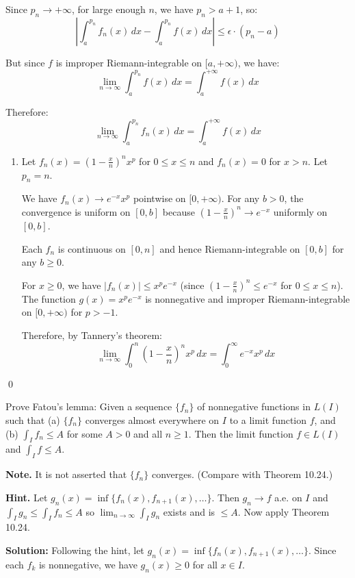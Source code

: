 Since $p_n \to +\infty$, for large enough $n$, we have $p_n > a + 1$, so:
\[|\int_a^{p_n} f_n(x) \, dx - \int_a^{p_n} f(x) \, dx| \leq \epsilon \cdot (p_n - a)\]

But since $f$ is improper Riemann-integrable on $[a,+\infty)$, we have:
\[\lim_{n \to \infty} \int_a^{p_n} f(x) \, dx = \int_a^{+\infty} f(x) \, dx\]

Therefore:
\[\lim_{n \to \infty} \int_a^{p_n} f_n(x) \, dx = \int_a^{+\infty} f(x) \, dx\]

\begin{enumerate}[label=(\alph*),resume]
    \item Let $f_n(x) = (1 - \frac{x}{n})^n x^p$ for $0 \leq x \leq n$ and $f_n(x) = 0$ for $x > n$. Let $p_n = n$.

    We have $f_n(x) \to e^{-x}x^p$ pointwise on $[0,+\infty)$. For any $b > 0$, the convergence is uniform on $[0,b]$ because $(1 - \frac{x}{n})^n \to e^{-x}$ uniformly on $[0,b]$.

    Each $f_n$ is continuous on $[0,n]$ and hence Riemann-integrable on $[0,b]$ for any $b \geq 0$.

    For $x \geq 0$, we have $|f_n(x)| \leq x^p e^{-x}$ (since $(1 - \frac{x}{n})^n \leq e^{-x}$ for $0 \leq x \leq n$). The function $g(x) = x^p e^{-x}$ is nonnegative and improper Riemann-integrable on $[0,+\infty)$ for $p > -1$.

    Therefore, by Tannery's theorem:
    \[\lim_{n \to \infty} \int_{0}^{n} \left( 1 - \frac{x}{n} \right)^n x^p \, dx = \int_{0}^{\infty} e^{-x}x^p \, dx\]
\end{enumerate}\qed


\begin{problembox}
Prove Fatou's lemma: Given a sequence $\{f_n\}$ of nonnegative functions in $L(I)$ such that (a) $\{f_n\}$ converges almost everywhere on $I$ to a limit function $f$, and (b) $\int_I f_n \leq A$ for some $A > 0$ and all $n \geq 1$. Then the limit function $f \in L(I)$ and $\int_I f \leq A$.

\textbf{Note.} It is not asserted that $\{f_n\}$ converges. (Compare with Theorem 10.24.)

\textbf{Hint.} Let $g_n(x) = \inf \{f_n(x), f_{n+1}(x), \ldots\}$. Then $g_n \to f$ a.e. on $I$ and $\int_I g_n \leq \int_I f_n \leq A$ so $\lim_{n \to \infty} \int_I g_n$ exists and is $\leq A$. Now apply Theorem 10.24.
\end{problembox}

\noindent\textbf{Solution:}
Following the hint, let $g_n(x) = \inf \{f_n(x), f_{n+1}(x), \ldots\}$. Since each $f_k$ is nonnegative, we have $g_n(x) \geq 0$ for all $x \in I$.


